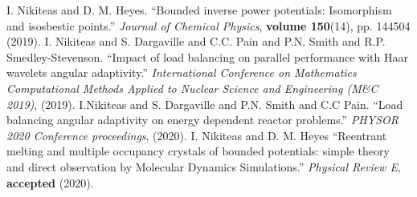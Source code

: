 \begingroup
\renewcommand{\section}[2]{}%
\begin{thebibliography}{}%
    I. Nikiteas and D. M. Heyes.
    ``Bounded inverse power potentials: Isomorphism and isosbestic points.''\newline
    \textit{Journal of Chemical Physics}, \textbf{volume 150}(14), pp. 144504 (2019).
    \newline \newline
    I. Nikiteas and S. Dargaville and C.C. Pain and P.N. Smith and R.P. Smedley-Stevenson.
    ``Impact of load balancing on parallel performance with Haar wavelets angular adaptivity.''
    \textit{International Conference on Mathematics Computational Methods Applied
    to Nuclear Science and Engineering (M\&C 2019)}, (2019).
    \newline \newline
    I.Nikiteas and S. Dargaville and P.N. Smith and C.C Pain.
    ``Load balancing angular adaptivity on energy dependent reactor problems.''
    \textit{PHYSOR 2020 Conference proceedings}, (2020).
    \newline \newline
    I. Nikiteas and D. M. Heyes
    ``Reentrant melting and multiple occupancy crystals of bounded
    potentials: simple theory and direct observation by Molecular
    Dynamics Simulations.'' \textit{Physical Review E}, \textbf{accepted} (2020).
\end{thebibliography}
%
%

